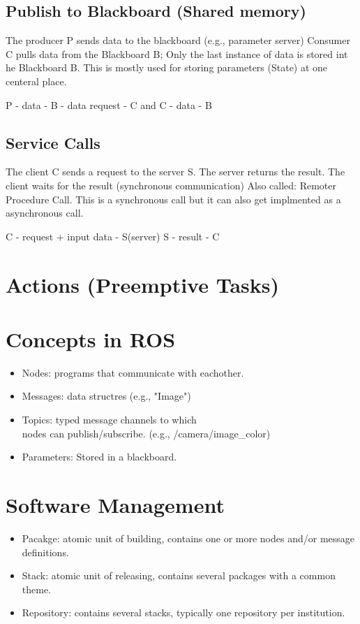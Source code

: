 \documentclass[]{report}
\begin{document}
\begin{itemize}
        \subsection*{Publish to Blackboard (Shared memory)}
        The producer P sends data to the blackboard (e.g., parameter server)
        Consumer C pulls data from the Blackboard B; Only the last instance of data is stored int he Blackboard B.
        This is mostly used for storing parameters (State) at one centeral place.

        P - data - B - data request - C and C - data - B

        \subsection*{Service Calls}
        The client C sends a request to the server S. The server returns the result. The client waits for the result (synchronous communication)
        Also called: Remoter Procedure Call. This is a synchronous call but it can also get implmented as a asynchronous call.

        C - request + input data - S(server)
        S - result - C

        \section*{Actions (Preemptive Tasks)}


        \section*{ Concepts in ROS}
        \begin{itemize}
            \item Nodes: programs that communicate with eachother.
            \item Messages: data structres (e.g., "Image")
            \item Topics: typed message channels to which \\ nodes can publish/subscribe.  (e.g., /camera/image\_color)
            \item Parameters: Stored in a blackboard.
        \end{itemize}

        \section*{Software Management}
        \begin{itemize}
            \item Pacakge: atomic unit of building, contains one or more nodes and/or message definitions.
            \item Stack: atomic unit of releasing, contains several packages with a common theme.
            \item Repository: contains several stacks, typically one repository per institution.
        \end{itemize}
    \end{itemize}
\end{document}
